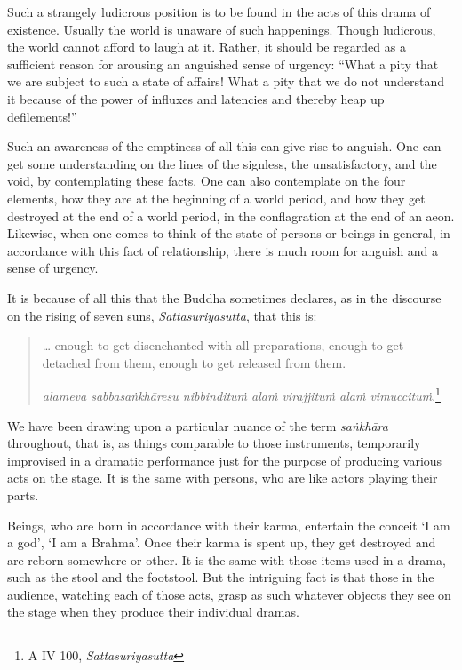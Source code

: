 Such a strangely ludicrous position is to be found in the acts of this drama of existence. Usually the world is unaware of such happenings. Though ludicrous, the world cannot afford to laugh at it. Rather, it should be regarded as a sufficient reason for arousing an anguished sense of urgency: ``What a pity that we are subject to such a state of affairs! What a pity that we do not understand it because of the power of influxes and latencies and thereby heap up defilements!''

Such an awareness of the emptiness of all this can give rise to anguish. One can get some understanding on the lines of the signless, the unsatisfactory, and the void, by contemplating these facts. One can also contemplate on the four elements, how they are at the beginning of a world period, and how they get destroyed at the end of a world period, in the conflagration at the end of an aeon. Likewise, when one comes to think of the state of persons or beings in general, in accordance with this fact of relationship, there is much room for anguish and a sense of urgency.

It is because of all this that the Buddha sometimes declares, as in the discourse on the rising of seven suns, \emph{Sattasuriyasutta}, that this is:

\begin{quote}
\ldots{} enough to get disenchanted with all preparations, enough to get detached from them, enough to get released from them.

\emph{alameva sabbasaṅkhāresu nibbindituṁ alaṁ virajjituṁ alaṁ vimuccituṁ}.\footnote{A IV 100, \emph{Sattasuriyasutta}}
\end{quote}

We have been drawing upon a particular nuance of the term \emph{saṅkhāra} throughout, that is, as things comparable to those instruments, temporarily improvised in a dramatic performance just for the purpose of producing various acts on the stage. It is the same with persons, who are like actors playing their parts.

Beings, who are born in accordance with their karma, entertain the conceit `I am a god', `I am a Brahma'. Once their karma is spent up, they get destroyed and are reborn somewhere or other. It is the same with those items used in a drama, such as the stool and the footstool. But the intriguing fact is that those in the audience, watching each of those acts, grasp as such whatever objects they see on the stage when they produce their individual dramas.


